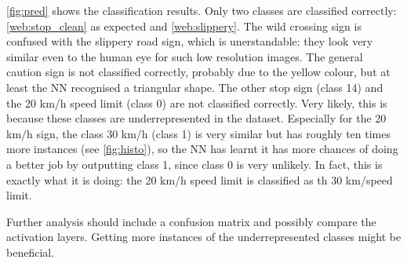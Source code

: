\documentclass{article}
\begin{document}
\autoref{fig:pred} shows the classification results. Only two classes are classified correctly: \autoref{web:stop_clean} as expected and \autoref{web:slippery}. The wild crossing sign is confused with the slippery road sign, which is unerstandable: they look very similar even to the human eye for such low resolution images. The general caution sign is not classified correctly, probably due to the yellow colour, but at least the NN recognised a triangular shape. The other stop sign (class 14) and the 20 km/h speed limit (class 0) are not classified correctly. Very likely, this is because these classes are underrepresented in the dataset. Especially for the 20 km/h sign, the class 30 km/h (class 1) is very similar but has roughly ten times more instances (see \autoref{fig:histo}), so the NN has learnt it has more chances of doing a better job by outputting class 1, since class 0 is very unlikely. In fact, this is exactly what it is doing: the 20 km/h speed limit is classified as th 30 km/speed limit.

Further analysis should include a confusion matrix and possibly compare the activation layers. Getting more instances of the underrepresented classes might be beneficial.
\end{document}
